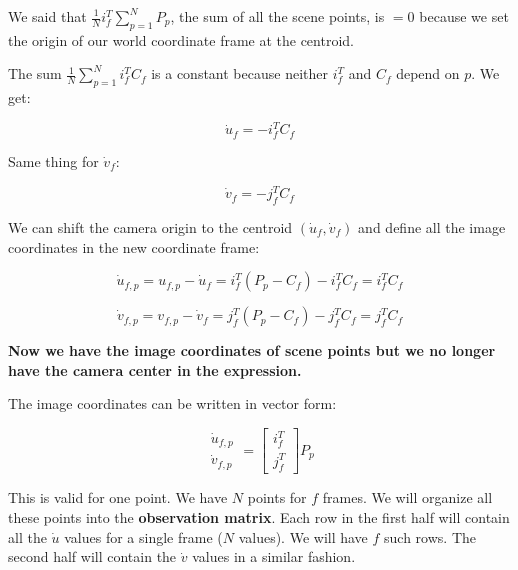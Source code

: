 \documentclass{article}
\begin{document}
We said that $\frac{1}{N} i_f^T \sum_{p=1}^N P_p$, the sum of all the scene points, is $=0$ because we set the origin of our world coordinate frame at the centroid.

The sum $\frac{1}{N} \sum_{p=1}^N i_f^T C_f$ is a constant because neither $i_f^T$ and $C_f$ depend on $p$. We get:

\begin{equation*}
    \dot u_f = -i_f^T C_f
\end{equation*}

Same thing for $\dot v_f$:

\begin{equation*}
    \dot v_f = -j_f^T C_f
\end{equation*}

We can shift the camera origin to the centroid $(\dot u_f, \dot v_f)$ and define all the image coordinates in the new coordinate frame:

\begin{equation*}
    \dot u_{f, p} = u_{f,p} - \dot u_f = i_f^T (P_p - C_f) - i_f^T C_f = i_f^T C_f
\end{equation*}

\begin{equation*}
    \dot v_{f, p} = v_{f,p} - \dot v_f = j_f^T (P_p - C_f) - j_f^T C_f = j_f^T C_f
\end{equation*}

\textbf{Now we have the image coordinates of scene points but we no longer have the camera center in the expression.}  

The image coordinates can be written in vector form:

\begin{equation*}
    \begin{matrix}
        \dot u_{f, p} \\
        \dot v_{f, p}
    \end{matrix}
    = 
    \begin{bmatrix}
        i_f^T \\
        j_f^T
    \end{bmatrix}
    P_p 
\end{equation*}

This is valid for one point. We have $N$ points for $f$ frames. We will organize all these points into the \textbf{observation matrix}. Each row in the first half will contain all the $\dot u$ values for a single frame ($N$ values). We will have $f$ such rows. The second half will contain the $\dot v$ values in a similar fashion.
\end{document}
